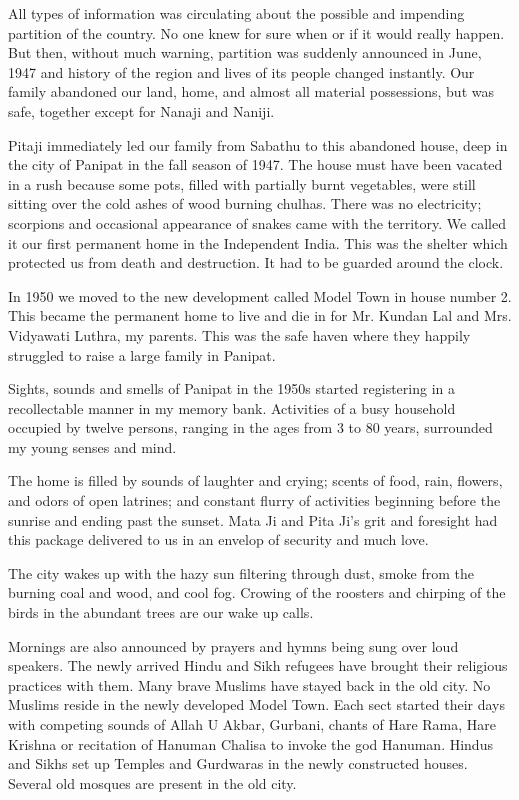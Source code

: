 All types of information was circulating about the possible and impending
partition of the country. No one knew for sure when or if it would really
happen. But then, without much warning, partition was suddenly announced
in June, 1947 and history of the region and lives of its people changed
instantly. Our family abandoned our land, home, and almost all material
possessions, but was safe, together except for Nanaji and Naniji. 

Pitaji immediately led our family from Sabathu to this abandoned house,
deep in the city of Panipat in the fall season of 1947. The house must
have been vacated in a rush because some pots, filled with partially burnt
vegetables, were still sitting over the cold ashes of wood burning
chulhas. There was no electricity; scorpions and occasional appearance of
snakes came with the territory. We called it our first permanent home in
the Independent India. This was the shelter which protected us from death
and destruction. It had to be guarded around the clock. 

In 1950 we moved to the new development called Model Town in house number
2. This became the permanent home to live and die in for Mr. Kundan Lal
and Mrs. Vidyawati Luthra, my parents. This was the safe haven where they
happily struggled to raise a large family in Panipat. 

Sights, sounds and smells of Panipat in the 1950s started registering in
a recollectable manner in my memory bank. Activities of a busy household
occupied by twelve persons, ranging in the ages from 3 to 80 years,
surrounded my young senses and mind. 

The home is filled by sounds of laughter and crying; scents of food, rain,
flowers, and odors of open latrines; and constant flurry of activities
beginning before the sunrise and ending past the sunset. Mata Ji and Pita
Ji’s grit and foresight had this package delivered to us in an envelop of
security and much love. 

The city wakes up with the hazy sun filtering through dust, smoke from the
burning coal and wood, and cool fog. Crowing of the roosters and chirping
of the birds in the abundant trees are our wake up calls. 

Mornings are also announced by prayers and hymns being sung over loud
speakers. The newly arrived Hindu and Sikh refugees have brought their
religious practices with them. Many brave Muslims have stayed back in the
old city. No Muslims reside in the newly developed Model Town. Each sect
started their days with competing sounds of Allah U Akbar, Gurbani, chants
of Hare Rama, Hare Krishna or recitation of Hanuman Chalisa to invoke the
god Hanuman. Hindus and Sikhs set up Temples and Gurdwaras in the newly
constructed houses. Several old mosques are present in the old city. 

